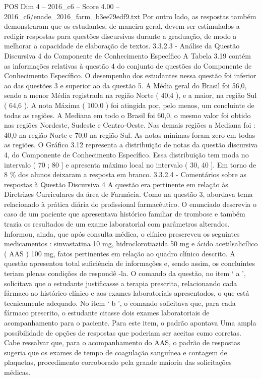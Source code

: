 \begin{textsample}{POS Dim 4 – 2016\_c6 – Score 4.00 – 2016\_c6/enade\_2016\_farm\_b3ee79edf9.txt}
Por outro lado, as respostas também demonstraram que os estudantes, de maneira geral, devem ser estimulados a redigir respostas para questões discursivas durante a graduação, de modo a melhorar a capacidade de elaboração de textos. 3.3.2.3 - Análise da Questão Discursiva 4 do Componente de Conhecimento Específico A Tabela 3.19 contém as informações relativas à questão 4 do conjunto de questões do Componente de Conhecimento Específico.
O desempenho dos estudantes nessa questão foi inferior ao das questões 3 e superior ao da questão 5.
A Média geral do Brasil foi 56,0, sendo a menor Média registrada na região Norte ( 40,4 ), e a maior, na região Sul ( 64,6 ).
A nota Máxima ( 100,0 ) foi atingida por, pelo menos, um concluinte de todas as regiões.
A Mediana em todo o Brasil foi 60,0, o mesmo valor foi obtido nas regiões Nordeste, Sudeste e Centro-Oeste.
Nas demais regiões a Mediana foi : 40,0 na região Norte e 70,0 na região Sul.
As notas mínimas foram zero em todas as regiões.
O Gráfico 3.12 representa a distribuição de notas da questão discursiva 4, do Componente de Conhecimento Específico.
Essa distribuição tem moda no intervalo ( 70 ; 80 ] e apresenta máximo local no intervalo ( 30, 40 ].
Em torno de 8 \% dos alunos deixaram a resposta em branco. 3.3.2.4 - Comentários sobre as respostas à Questão Discursiva 4 A questão era pertinente em relação às Diretrizes Curriculares da área de Farmácia.
Como na questão 3, abordava tema relacionado à prática diária do profissional farmacêutico.
O enunciado descrevia o caso de um paciente que apresentava histórico familiar de trombose e também trazia os resultados de um exame laboratorial com parâmetros alterados.
Informou, ainda, que após consulta médica, o clínico prescreveu os seguintes medicamentos : sinvastatina 10 mg, hidroclorotiazida 50 mg e ácido acetilsalicílico ( AAS ) 100 mg, fatos pertinentes em relação ao quadro clínico descrito.
A questão apresentou total suficiência de informações e, sendo assim, os concluintes teriam plenas condições de respondê -la.
O comando da questão, no item ‘ a ’, solicitava que o estudante justificasse a terapia prescrita, relacionando cada fármaco ao histórico clínico e aos exames laboratoriais apresentados, o que está tecnicamente adequado.
No item ‘ b ’, o comando solicitava que, para cada fármaco prescrito, o estudante citasse dois exames laboratoriais de acompanhamento para o paciente.
Para este item, o padrão apontava Uma ampla possibilidade de opções de respostas que poderiam ser aceitas como corretas.
Cabe ressalvar que, para o acompanhamento do AAS, o padrão de respostas sugeria que os exames de tempo de coagulação sanguínea e contagem de plaquetas, procedimento corroborado pela grande maioria das solicitações médicas.

\end{textsample}

